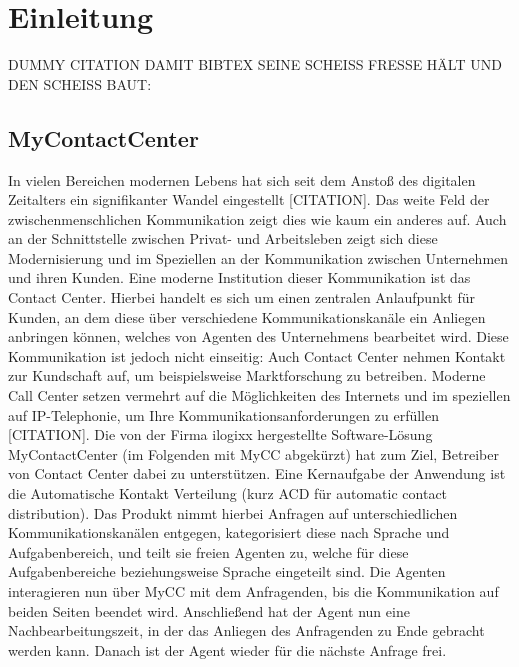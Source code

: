 \chapter{Einleitung}
\label{chap:Einleitung}

DUMMY CITATION DAMIT BIBTEX SEINE SCHEISS FRESSE HÄLT UND DEN SCHEISS BAUT: \cite{Coloouris:02}

\section{MyContactCenter}
In vielen Bereichen modernen Lebens hat sich seit dem Anstoß des digitalen Zeitalters ein signifikanter Wandel eingestellt [CITATION]. Das weite Feld  der zwischenmenschlichen Kommunikation zeigt dies wie kaum ein anderes auf. Auch an der Schnittstelle zwischen Privat- und Arbeitsleben zeigt sich diese Modernisierung und im Speziellen an der Kommunikation zwischen Unternehmen und ihren Kunden. Eine moderne Institution dieser Kommunikation ist das Contact Center. Hierbei handelt es sich um einen zentralen Anlaufpunkt für Kunden, an dem diese über verschiedene Kommunikationskanäle ein Anliegen anbringen können, welches von Agenten des Unternehmens bearbeitet wird. Diese Kommunikation ist jedoch nicht einseitig: Auch Contact Center nehmen Kontakt zur Kundschaft auf, um beispielsweise Marktforschung zu betreiben. 
\newline
Moderne Call Center setzen vermehrt auf die Möglichkeiten des Internets und im speziellen auf IP-Telephonie, um Ihre Kommunikationsanforderungen zu erfüllen [CITATION]. Die von der Firma ilogixx hergestellte Software-Lösung MyContactCenter (im Folgenden mit MyCC abgekürzt) hat zum Ziel, Betreiber von Contact Center dabei zu unterstützen. Eine Kernaufgabe der Anwendung ist die Automatische Kontakt Verteilung (kurz ACD für automatic contact distribution). Das Produkt nimmt hierbei Anfragen auf unterschiedlichen Kommunikationskanälen entgegen, kategorisiert diese nach Sprache und Aufgabenbereich, und teilt sie freien Agenten zu, welche für diese Aufgabenbereiche beziehungsweise Sprache eingeteilt sind. Die Agenten interagieren nun über MyCC mit dem Anfragenden, bis die Kommunikation auf beiden Seiten beendet wird. Anschließend hat der Agent nun eine Nachbearbeitungszeit, in der das Anliegen des Anfragenden zu Ende gebracht werden kann. Danach ist der Agent wieder für die nächste Anfrage frei.
\newline
